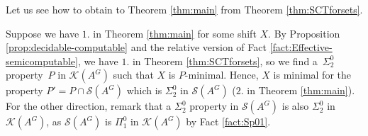 \documentclass[french,american]{article}
\theoremstyle{plain}
\theoremstyle{definition}
\theoremstyle{remark}
\theoremstyle{plain}
\begin{document}
Let us see how to obtain to Theorem \ref{thm:main} from Theorem \ref{thm:SCTforsets}.

Suppose we have $1.$ in Theorem \ref{thm:main} for some shift $X$. By Proposition \ref{prop:decidable-computable} and the relative version of Fact \ref{fact:Effective-semicomputable}, we have $1.$ in Theorem \ref{thm:SCTforsets}, so we find a~$\Sigma_{2}^{0}$ property~$P$ in $\mathcal{K}(A^{G})$
such that $X$ is $P$-minimal. Hence, $X$ is minimal for the property $P'=P \cap \mathcal{S}(A^{G})$ which is $\Sigma_{2}^{0}$ in $\mathcal{S}(A^{G})$ ($2.$ in Theorem \ref{thm:main}).
For the other direction, remark that a $\Sigma_{2}^{0}$ property in $\mathcal{S}(A^{G})$ is also $\Sigma_{2}^{0}$ in $\mathcal{K}(A^{G})$, as $\mathcal{S}(A^{G})$ is $\Pi_1^0$ in $\mathcal{K}(A^{G})$ by Fact \ref{fact:Sp01}.
\end{document}
